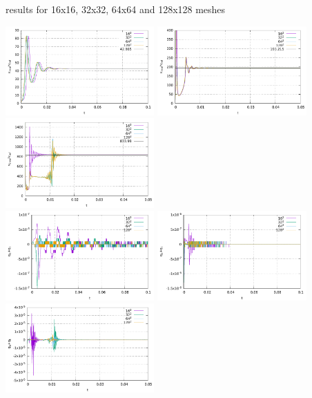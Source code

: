 \newpage
\aspect results for 16x16, 32x32, 64x64 and 128x128 meshes

\begin{center}
\includegraphics[width=5.7cm]{python_codes/fieldstone_110/results_BA/aspect/vrms_1e4}
\includegraphics[width=5.7cm]{python_codes/fieldstone_110/results_BA/aspect/vrms_1e5}
\includegraphics[width=5.7cm]{python_codes/fieldstone_110/results_BA/aspect/vrms_1e6}\\
\includegraphics[width=5.7cm]{python_codes/fieldstone_110/results_BA/aspect/qsum_1e4}
\includegraphics[width=5.7cm]{python_codes/fieldstone_110/results_BA/aspect/qsum_1e5}
\includegraphics[width=5.7cm]{python_codes/fieldstone_110/results_BA/aspect/qsum_1e6}\\

\end{center}
